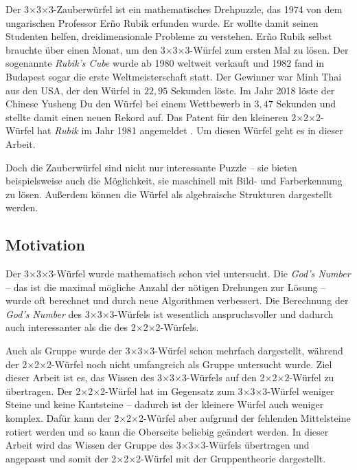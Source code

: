 \documentclass[12pt,a4paper, usenames, dvipsnames]{article}
\theoremstyle{mystyle}
\theoremstyle{definition}
\newcommand{\Ttwo}{2$\times$2$\times$2-}
\newcommand{\Tthree}{3$\times$3$\times$3-}
\begin{document}
Der \Tthree Zauberwürfel ist ein mathematisches Drehpuzzle, das 1974 von dem ungarischen Professor Er\~{n}o Rubik erfunden wurde. Er wollte damit seinen Studenten helfen, dreidimensionale Probleme zu verstehen. Er\~{n}o Rubik selbst brauchte über einen Monat, um den \Tthree Würfel zum ersten Mal zu lösen.
Der sogenannte \textit{Rubik's Cube} wurde ab 1980 weltweit verkauft und 1982 fand in Budapest sogar die erste Weltmeisterschaft statt. Der Gewinner war Minh Thai aus den USA, der den Würfel in $22,95$ Sekunden löste. \cite{RC} Im Jahr 2018 löste der Chinese Yusheng Du den Würfel bei einem Wettbewerb in $3,47$ Sekunden und stellte damit einen neuen Rekord auf. \cite{rekord}
Das Patent für den kleineren \Ttwo Würfel hat \textit{Rubik} im Jahr 1981 angemeldet \cite{patent}. Um diesen Würfel geht es in dieser Arbeit.

Doch die Zauberwürfel sind nicht nur interessante Puzzle -- sie bieten beispielsweise auch die Möglichkeit, sie maschinell mit Bild- und Farberkennung zu lösen. Außerdem können die Würfel als algebraische Strukturen dargestellt werden.

%
%
%
%
%
%
%
%
\subsection{Motivation} 




Der \Tthree Würfel wurde mathematisch schon viel untersucht. 
Die \textit{God's Number} -- das ist die maximal mögliche Anzahl der nötigen Drehungen zur Lösung -- wurde oft berechnet und durch neue Algorithmen verbessert. 
Die Berechnung der \textit{God's Number} des \Tthree Würfels ist wesentlich anspruchsvoller und dadurch auch interessanter als die des \Ttwo Würfels. 

Auch als Gruppe wurde der \Tthree Würfel schon mehrfach dargestellt, während der \Ttwo Würfel
noch nicht umfangreich als Gruppe untersucht wurde. Ziel dieser Arbeit ist es, das Wissen des \Tthree Würfels auf den \Ttwo Würfel zu übertragen. Der \Ttwo Würfel hat im Gegensatz zum \Tthree Würfel weniger Steine und keine Kantsteine -- dadurch ist der kleinere Würfel auch weniger komplex. Dafür kann der \Ttwo Würfel aber aufgrund der fehlenden Mittelsteine rotiert werden und so kann die Oberseite beliebig geändert werden. In dieser Arbeit wird das Wissen der Gruppe des \Tthree Würfels übertragen und angepasst und somit der \Ttwo Würfel mit der Gruppentheorie dargestellt.
\end{document}
